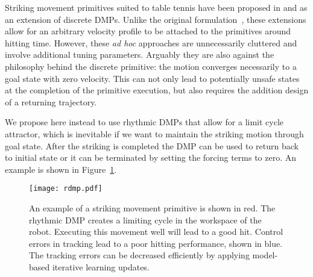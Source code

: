 Striking movement primitives suited to table tennis have been proposed in \cite{Kober10} and \cite{Muelling13} as an extension of discrete DMPs. Unlike the original formulation~\cite{Ijspeert02}, these extensions allow for an arbitrary velocity profile to be attached to the primitives around hitting time. However, these \emph{ad hoc} approaches are unnecessarily cluttered and involve additional tuning parameters. Arguably they are also against the philosophy behind the discrete primitive: the motion converges necessarily to a goal state with zero velocity. This can not only lead to potentially unsafe states at the completion of the primitive execution, but also requires the addition design of a returning trajectory.

We propose here instead to use rhythmic DMPs that allow for a limit cycle attractor, which is inevitable if we want to maintain the striking motion through goal state. After the striking is completed the DMP can be used to return back to initial state or it can be terminated by setting the forcing terms to zero. An example is shown in Figure~\ref{rdmp}.

\begin{figure}[b!]
\center
\texttt{[image: rdmp.pdf]}
\caption{An example of a striking movement primitive is shown in red. The rhythmic DMP creates a limiting cycle in the workspace of the robot. Executing this movement well will lead to a good hit. Control errors in tracking lead to a poor hitting performance, shown in blue. The tracking errors can be decreased efficiently by applying model-based iterative learning updates.} 
\label{rdmp}
\end{figure}

